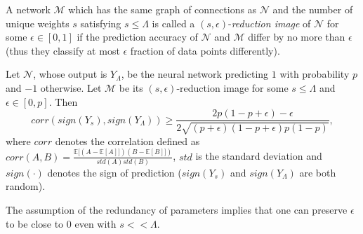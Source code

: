 \documentclass[twoside]{article}
\begin{document}
\begin{definition}
A network $\mathcal{M}$ which has the same graph of connections as $\mathcal{N}$ and the number of unique weights $s$ satisfying $s \leq \Lambda$ is called a $(s,\epsilon)$-\textit{reduction image} of $\mathcal{N}$ for some $\epsilon \in [0,1]$ if the prediction accuracy of $\mathcal{N}$ and $\mathcal{M}$ differ by no more than $\epsilon$ (thus they classify at most $\epsilon$ fraction of data points differently).
\end{definition}

\begin{theorem}
Let $\mathcal{N}$, whose output is $Y_{\Lambda}$, be the neural network predicting $1$ with probability $p$ and $-1$ otherwise. Let $\mathcal{M}$ be its $(s,\epsilon)$-reduction image for some $s \leq \Lambda$ and $\epsilon \in [0,p]$. Then
\[corr(sign(Y_s),sign(Y_{\Lambda})) \geq \frac{2p(1 \!-\! p \!+\! \epsilon) \!-\! \epsilon}{2\sqrt{(p \!+\! \epsilon)(1 \!-\! p \!+\! \epsilon)p(1 \!-\! p)}},
\]
where $corr$ denotes the correlation defined as $corr(A,B) = \frac{\mathbb{E}[(A - \mathbb{E}[A]])(B - \mathbb{E}[B]])}{std(A)std(B)}$, $std$ is the standard deviation and $sign(\cdot)$ denotes the sign of prediction ($sign(Y_s)$ and $sign(Y_{\Lambda})$ are both random).
\label{thm:redun}
\end{theorem}

The assumption of the redundancy of parameters implies that one can preserve $\epsilon$ to be close to $0$ even with $s << \Lambda$.
\end{document}
